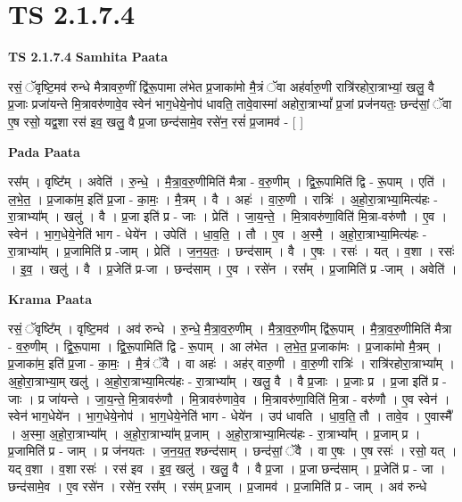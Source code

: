 \documentclass[17pt]{extarticle}
\begin{document}
\section*{ TS 2.1.7.4 }

\textbf{TS 2.1.7.4 } \newline
\textbf{Samhita Paata} \newline

रसं॒ ॅवृष्टि॒मव॑ रुन्धे मैत्रावरु॒णीं द्वि॑रू॒पामा ल॑भेत प्र॒जाका॑मो मै॒त्रं ॅवा अह॑र्वारु॒णी रात्रि॑रहोरा॒त्राभ्यां॒ खलु॒ वै प्र॒जाः प्रजा॑यन्ते मि॒त्रावरु॑णावे॒व स्वेन॑ भाग॒धेये॒नोप॑ धावति॒ तावे॒वास्मा॑ अहोरा॒त्राभ्यां᳚ प्र॒जां प्रज॑नयतः॒ छन्द॑सां॒ ॅवा ए॒ष रसो॒ यद्व॒शा रस॑ इव॒ खलु॒ वै प्र॒जा छन्द॑सामे॒व रसे॑न॒ रसं॑ प्र॒जामव॑ - [  ] \newline

\textbf{Pada Paata} \newline

रस᳚म् । वृष्टि᳚म् । अवेति॑ । रु॒न्धे॒ । मै॒त्रा॒व॒रु॒णीमिति॑ मैत्रा - व॒रु॒णीम् । द्वि॒रू॒पामिति॑ द्वि - रू॒पाम् । एति॑ । ल॒भे॒त॒ । प्र॒जाका॑म॒ इति॑ प्र॒जा - का॒मः॒ । मै॒त्रम् । वै । अहः॑ । वा॒रु॒णी । रात्रिः॑ । अ॒हो॒रा॒त्राभ्या॒मित्य॑हः - रा॒त्राभ्या᳚म् । खलु॑ । वै । प्र॒जा इति॑ प्र - जाः । प्रेति॑ । जा॒य॒न्ते॒ । मि॒त्रावरु॑णा॒विति॑ मि॒त्रा-वरु॑णौ । ए॒व । स्वेन॑ । भा॒ग॒धेये॒नेति॑ भाग - धेये॑न । उपेति॑ । धा॒व॒ति॒ । तौ । ए॒व । अ॒स्मै॒ । अ॒हो॒रा॒त्राभ्या॒मित्य॑हः - रा॒त्राभ्या᳚म् । प्र॒जामिति॑ प्र -जाम् । प्रेति॑ । ज॒न॒य॒तः॒ । छन्द॑साम् । वै । ए॒षः । रसः॑ । यत् । व॒शा । रसः॑ । इ॒व॒ । खलु॑ । वै । प्र॒जेति॑ प्र-जा । छन्द॑साम् । ए॒व । रसे॑न । रस᳚म् । प्र॒जामिति॑ प्र -जाम् । अवेति॑ ।  \newline


\textbf{Krama Paata} \newline

रसं॒ ॅवृष्टि᳚म् । वृष्टि॒मव॑ । अव॑ रुन्धे । रु॒न्धे॒ मै॒त्रा॒व॒रु॒णीम् । मै॒त्रा॒व॒रु॒णीम् द्वि॑रू॒पाम् । मै॒त्रा॒व॒रु॒णीमिति॑ मैत्रा - व॒रु॒णीम् । द्वि॒रू॒पामा । द्वि॒रू॒पामिति॑ द्वि - रू॒पाम् । आ ल॑भेत । ल॒भे॒त॒ प्र॒जाका॑मः । प्र॒जाका॑मो मै॒त्रम् । प्र॒जाका॑म॒ इति॑ प्र॒जा - का॒मः॒ । मै॒त्रं ॅवै । वा अहः॑ । अह॑र् वारु॒णी । वा॒रु॒णी रात्रिः॑ । 
रात्रि॑रहोरा॒त्राभ्या᳚म् । अ॒हो॒रा॒त्राभ्या॒म् खलु॑ । अ॒हो॒रा॒त्राभ्या॒मित्य॑हः - रा॒त्राभ्या᳚म् । खलु॒ वै । वै प्र॒जाः । प्र॒जाः प्र । प्र॒जा इति॑ प्र - जाः । प्र जा॑यन्ते । जा॒य॒न्ते॒ मि॒त्रावरु॑णौ । मि॒त्रावरु॑णावे॒व । मि॒त्रावरु॑णा॒विति॑ मि॒त्रा - वरु॑णौ । ए॒व स्वेन॑ । स्वेन॑ भाग॒धेये॑न । भा॒ग॒धेये॒नोप॑ । भा॒ग॒धेये॒नेति॑ भाग - धेये॑न । उप॑ धावति । धा॒व॒ति॒ तौ । तावे॒व । ए॒वास्मै᳚ । अ॒स्मा॒ अ॒हो॒रा॒त्राभ्या᳚म् । अ॒हो॒रा॒त्राभ्या᳚म् प्र॒जाम् । अ॒हो॒रा॒त्राभ्या॒मित्य॑हः - रा॒त्राभ्या᳚म् । प्र॒जाम् प्र । प्र॒जामिति॑ प्र - जाम् । प्र ज॑नयतः । ज॒न॒य॒त॒ श्छन्द॑साम् । छन्द॑सां॒ ॅवै । वा ए॒षः । ए॒ष रसः॑ । रसो॒ यत् । यद् व॒शा । व॒शा रसः॑ । रस॑ इव । इ॒व॒ खलु॑ । खलु॒ वै । वै प्र॒जा । प्र॒जा छन्द॑साम् । प्र॒जेति॑ प्र - जा । छन्द॑सामे॒व । ए॒व रसे॑न । रसे॑न॒ रस᳚म् । रस॑म् प्र॒जाम् । प्र॒जामव॑ । प्र॒जामिति॑ प्र - जाम् । अव॑ रुन्धे \newline
\end{document}
